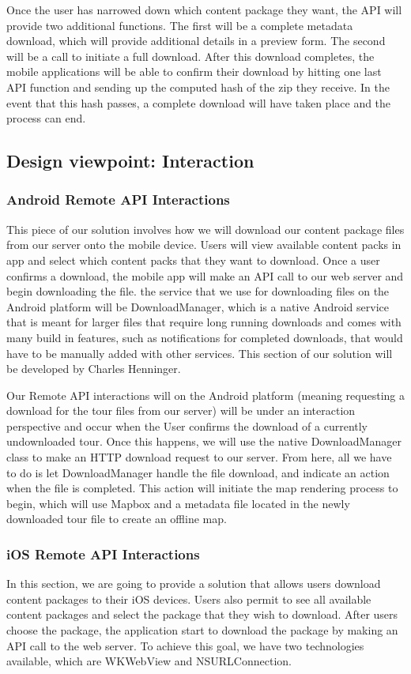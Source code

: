 \documentclass[letterpaper, 10pt,titlepage]{article}
\begin{document}
Once the user has narrowed down which content package they want, the API will provide two additional functions. The first will be a complete metadata download, which will provide additional details in a preview form. The second will be a call to initiate a full download. After this download completes, the mobile applications will be able to confirm their download by hitting one last API function and sending up the computed hash of the zip they receive. In the event that this hash passes, a complete download will have taken place and the process can end.


\subsection{Design viewpoint: Interaction}

\subsubsection{Android Remote API Interactions}
This piece of our solution involves how we will download our content package files from our server onto the mobile device. Users will view available content packs in app and select which content packs that they want to download. Once a user confirms a download, the mobile app will make an API call to our web server and begin downloading the file. the service that we use for downloading files on the Android platform will be DownloadManager, which is a native Android service that is meant for larger files that require long running downloads and comes with many build in features, such as notifications for completed downloads, that would have to be manually added with other services. This section of our solution will be developed by Charles Henninger.


Our Remote API interactions will on the Android platform (meaning requesting a download for the tour files from our server) will be under an interaction perspective and occur when the User confirms the download of a currently undownloaded tour. Once this happens, we will use the native DownloadManager class to make an HTTP download request to our server. From here, all we have to do is let DownloadManager handle the file download, and indicate an action when the file is completed. This action will initiate the map rendering process to begin, which will use Mapbox and a metadata file located in the newly downloaded tour file to create an offline map.



\subsubsection{iOS Remote API Interactions}
In this section, we are going to provide a solution that allows users download content packages to their iOS devices. Users also permit to see all available content packages and select the package that they wish to download. After users choose the package, the application start to download the package by making an API call to the web server. To achieve this goal, we have two technologies available, which are WKWebView and NSURLConnection.
\end{document}
